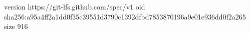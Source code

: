 version https://git-lfs.github.com/spec/v1
oid sha256:a95a4ff2a1dd0f35c39551d3790c1392dfbd7853870196a9e01e936dd0f2a265
size 916
